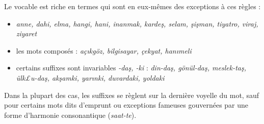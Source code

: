 \documentclass{cours}
\newcommand{\ch}{\c{s}}
\begin{document}
Le vocable est riche en termes qui sont en eux-mêmes des exceptions à ces règles :
\begin{itemize}
    \item \textsl{anne, dahi, elma, hangi, hani, inanmak, karde\ch, selam, \ch i\ch man, tiyatro, viraj, ziyaret}
    \item les mots composés : \textsl{aç\i kgöz, bilgisayar, çekyat, han\i meli}
    \item certains suffixes sont invariables {\sl -da\ch, -ki} : \textsl{din-da\ch, gönül-da\ch, meslek-ta\ch, ülk£u-da\ch, ak\ch amki, yar\i nki, duvardaki, yoldaki}
\end{itemize}
Dans la plupart des cas, les suffixes se règlent sur la dernière voyelle du mot, sauf pour certains mots dits \og d'emprunt \fg ou exceptions fameuses gouvernées par une forme d'harmonie consonantique ({\sl saat-te}).
\end{document}
